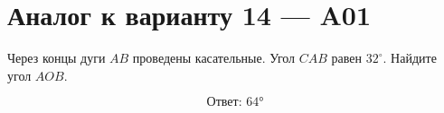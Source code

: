 


\section*{Аналог к варианту 14 — A01}
Через концы дуги \(AB\) проведены касательные. Угол \(CAB\) равен \(32^\circ\). Найдите угол \(AOB\).
\begin{center}\figTangentPair\end{center}
\[\boxed{\text{Ответ: }64°}\]

